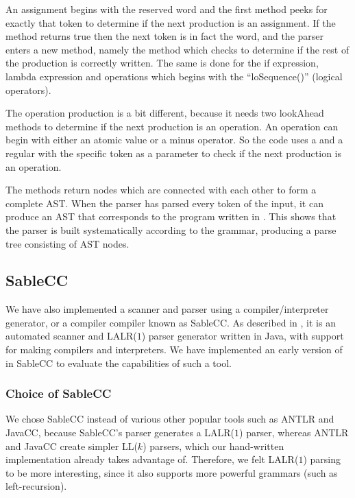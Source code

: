 An assignment begins with the reserved word  and the first
 method peeks for exactly that token to determine
if the next production is an assignment. If the method returns true then
the next token is in fact the  word, and the parser enters a
new method, namely the  method which checks to
determine if the rest of the production is correctly written. The same
is done for the if expression, lambda expression and operations which
begins with the ``loSequence()'' (logical operators).

The operation production is a bit different, because it needs two lookAhead
methods to determine if the next production is an operation. An operation can
begin with either an atomic value or a minus operator. So the code uses a
 and a regular  with the
specific token as a parameter to check if the next production is an operation.

The methods return nodes which are connected with each other to form
a complete AST\@. When the parser has parsed every token of the input,
it can produce an AST that corresponds to the program written in
\productname{}. This shows that the parser is built systematically
according to the grammar, producing a parse tree consisting of AST
nodes.

\subsection{SableCC}
We have also implemented a scanner and parser using a
compiler/interpreter generator, or a compiler compiler
known as SableCC\cite{sableccdoc}. As described in
, it is an automated scanner and
LALR($1$) parser generator written in Java, with support for making
compilers and interpreters. We have implemented an early version of
\productname{} in SableCC to evaluate the capabilities of such a tool.

\subsubsection{Choice of SableCC}
We chose SableCC instead of various other popular tools such as
ANTLR\cite{antlr} and JavaCC\cite{javacc}, because SableCC's parser
generates a LALR($1$) parser, whereas ANTLR and JavaCC create simpler
LL($k$) parsers, which our hand-written implementation already takes advantage of.
Therefore, we felt LALR($1$) parsing to be more interesting, since it
also supports more powerful grammars (such as left-recursion).

